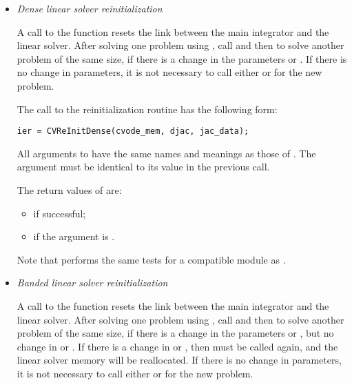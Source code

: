 \begin{itemize}

\item {\em Dense linear solver reinitialization} 

  A call to the  function resets the link between   
  the main {\cvodes} integrator and the {\cvdense} linear solver.       
  After solving one problem using {\cvdense}, call  and then
   to solve another problem of the same size, if    
  there is a change in the  parameters  or .  
  If there is no change in parameters, it is not necessary to    
  call either  or  for the new problem.  

  The call to the {\cvdense} reinitialization routine has the following form:
\begin{verbatim}
ier = CVReInitDense(cvode_mem, djac, jac_data);
\end{verbatim}
  All arguments to  have the same names and meanings
  as those of .  The  argument must be identical 
  to its value in the previous  call.                     
  
  The return values of  are:
  \begin{itemize}
  \item {} if successful;
  \item {} if the  argument is .
  \end{itemize}         
  
  Note that  performs the same tests for a compatible {\nvector} 
  module as .
  
\item {\em Banded linear solver reinitialization}
  
  A call to the  function resets the link between    
  the main {\cvodes} integrator and the {\cvband} linear solver.        
  After solving one problem using {\cvband}, call  and then 
   to solve another problem of the same size, if     
  there is a change in the  parameters  or ,   
  but no change in  or .  If there is a change in    
   or , then  must be called again, and the    
  linear solver memory will be reallocated.                      
  If there is no change in parameters, it is not necessary to    
  call either  or  for the new problem.


\end{itemize}
